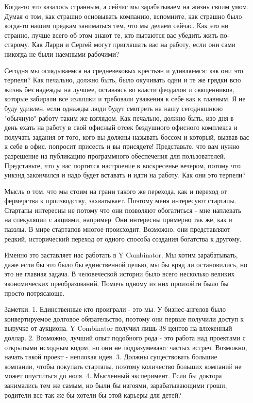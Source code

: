 \documentclass[ebook,12pt,oneside,openany]{memoir}
\begin{document}
Когда-то это казалось странным, а сейчас мы зарабатываем на жизнь
своим умом. Думая о том, как страшно основывать компанию, вспомните,
как страшно было когда-то нашим предкам заниматься тем, что мы делаем
сейчас. Как это ни странно, лучше всего об этом знают те, кто пытаются
вас убедить жить по-старому. Как Ларри и Сергей могут приглашать вас
на работу, если они сами никогда не были наемными рабочими?

Сегодня мы оглядываемся на средневековых крестьян и удивляемся: как
они это терпели? Как печально, должно быть, было окучивать одни и те
же грядки всю жизнь без надежды на лучшее, оставаясь во власти
феодалов и священников, которые забирали все излишки и требовали
уважения к себе как к главным. Я не буду удивлен, если однажды люди
будут смотреть на нашу сегодняшнюю "обычную" работу таким же взглядом.
Как печально, должно быть, изо дня в день ехать на работу в свой
офисный отсек бездушного офисного комплекса и получать задания от
того, кого вы должны называть боссом и который, вызвав вас к себе в
офис, попросит присесть и вы присядете! Представьте, что вам нужно
разрешение на публикацию программного обеспечения для пользователей.
Представьте, что у вас портится настроение в воскресенье вечером,
потому что уикэнд закончился и надо будет вставать и идти на работу.
Как они это терпели?

Мысль о том, что мы стоим на грани такого же перехода, как и переход
от фермерства к производству, захватывает. Поэтому меня интересуют
стартапы. Стартапы интересны не потому что они позволяют обогатиться -
мне наплевать на спекуляции с акциями, например. Они интересны
примерно так же, как и паззлы. В мире стартапов многое происходит.
Возможно, они представляют редкий, исторический переход от одного
способа создания богатства к другому.

Именно это заставляет нас работать в Y Combinator. Мы хотим
зарабатывать, даже если бы это было бы единственной целью, мы бы вряд
ли остановились, но это не главная задача. В человеческой истории было
всего несколько великих экономических преобразований. Помочь одному из
них произойти было бы просто потрясающе.

Заметки. 1. Единственные кто проиграли - это мы. У бизнес-ангелов было
конвертируемое долговое обязательство, поэтому они первые получили
доступ к выручке от аукциона. Y Combinator получил лишь 38 центов на
вложенный доллар. 2. Возможно, лучший опыт подобного рода - это работа
над проектами с открытыми исходным кодом, но они не подразумевают
частых встреч. Возможно, начать такой проект - неплохая идея. 3.
Должны существовать большие компании, чтобы покупать стартапы, поэтому
количество больших компаний не может опуститься до ноля. 4. Мысленный
эксперимент. Если бы доктора занимались тем же самым, но были бы
изгоями, зарабатывающими гроши, родители все так же бы хотели бы этой
карьеры для детей?
\end{document}

